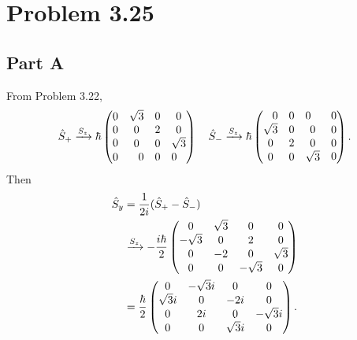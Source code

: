 \documentclass{article}
\begin{document}
\section*{Problem 3.25}
\subsection*{Part A}
From Problem 3.22,
\[
    \hat{S}_+ \xrightarrow{S_z}
    \hbar \pmqty{\mqty{0\\0\\0} & \mqty{\dmat[0]{\sqrt{3},2,\sqrt{3}}}\\ 0 & \mqty{0&0&0}}
    \quad
    \hat{S}_- \xrightarrow{S_z}
    \hbar \pmqty{\mqty{0 & 0 & 0} & \mqty{0} \\ \mqty{\dmat[0]{\sqrt{3}, 2, \sqrt{3}}} & \mqty{0 \\ 0 \\ 0}}.
\]
Then 
\[
    \begin{split}
        \hat{S}_y &=\frac{1}{2i}(\hat{S}_+-\hat{S}_-) \\
        &\xrightarrow{S_z}
        -\frac{i\hbar}{2} 
        \pmqty{0 & \sqrt{3} & 0 & 0 \\ -\sqrt{3} & 0 & 2 & 0 \\ 0 & -2 & 0 & \sqrt{3} \\ 0 & 0 & -\sqrt{3} & 0}\\
        &=\frac{\hbar}{2}
        \pmqty{0 & -\sqrt{3}i & 0 & 0 \\ \sqrt{3}i & 0 & -2i & 0 \\ 0 & 2i & 0 & -\sqrt{3}i \\ 0 & 0 & \sqrt{3}i & 0}.
    \end{split}
\]
\end{document}
